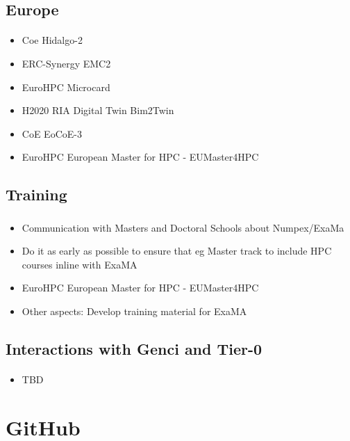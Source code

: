\subsection{Europe}
\begin{frame}{\insertsectionhead}
  \framesubtitle{\insertsubsectionhead}
\begin{itemize}
    \item Coe Hidalgo-2 
    \item ERC-Synergy	EMC2
    \item EuroHPC	Microcard
    \item H2020 RIA Digital Twin	Bim2Twin
    \item CoE	EoCoE-3	
    \item EuroHPC	European Master for HPC - EUMaster4HPC	
\end{itemize}
\end{frame}

\subsection{Training}
\begin{frame}
  \frametitle{\insertsectionhead}
  \framesubtitle{\insertsubsectionhead}
  
  \begin{itemize}
    \item Communication with Masters and Doctoral Schools about Numpex/ExaMa
    \item Do it as early as possible to ensure that eg Master track to include HPC courses inline with ExaMA
    \item EuroHPC	European Master for HPC - EUMaster4HPC	
    \item Other aspects: Develop training material for ExaMA
  \end{itemize}
\end{frame}
\subsection{Interactions with Genci and Tier-0}
\begin{frame}{\insertsectionhead}
  \framesubtitle{\insertsubsectionhead}

\begin{itemize}
    \item TBD
\end{itemize}
\end{frame}

\section{GitHub}
